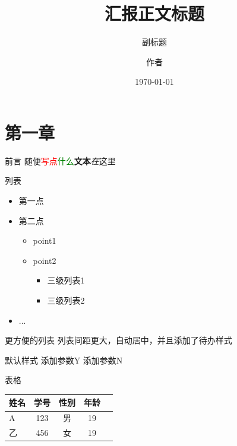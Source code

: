 \documentclass{beamer}
\title{汇报正文标题}
\subtitle{副标题}
\author{作者}
\date{\today}
\begin{document}
\maketitle

\section{第一章}
\begin{frame}{前言}
    \centering
    随便\textcolor{red}{写点}\textcolor{green}{什么}\textbf{文本}\textit{在}这里
\end{frame}

\begin{frame}{列表}
    \begin{itemize}
        \item 第一点
        \item 第二点
        \begin{itemize}
            \item point1
            \item point2
            \begin{itemize}
                \item 三级列表1
                \item 三级列表2
            \end{itemize}
        \end{itemize}
        \item ...
    \end{itemize}
\end{frame}

\begin{frame}{更方便的列表}
\centering
列表间距更大，自动居中，并且添加了待办样式
\vspace{2cm}
    \begin{citemize}{0.3}
        \litem 默认样式
        \litem[Y] 添加参数Y
        \litem[N] 添加参数N
    \end{citemize}
\end{frame}

\begin{frame}{表格}
    \begin{table}
        \centering
        \begin{tabular}{lcccc}
            \toprule
            姓名 & 学号 & 性别 & 年龄 \\
            \midrule
            A & 123 & 男 & 19 \\
            乙 & 456 & 女 & 19 \\
            \bottomrule
        \end{tabular}
    \end{table}
\end{frame}
\end{document}
